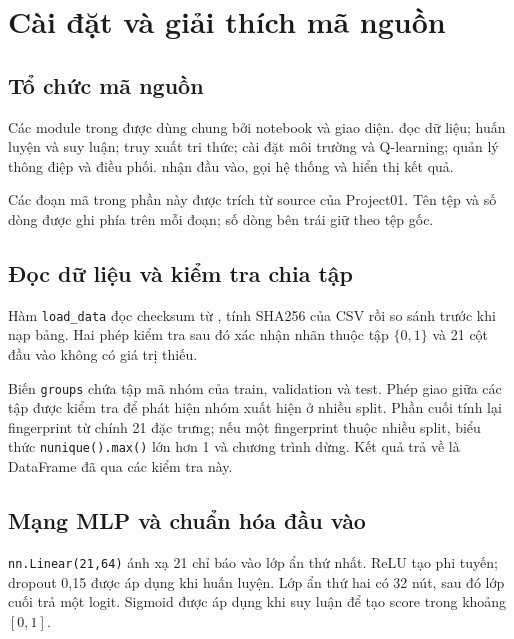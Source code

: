 \chapter{Cài đặt và giải thích mã nguồn}
\section{Tổ chức mã nguồn}
Các module trong  được dùng chung bởi notebook và giao diện.  đọc dữ liệu;  huấn luyện và suy luận;  truy xuất tri thức;  cài đặt môi trường và Q-learning;  quản lý thông điệp và điều phối.  nhận đầu vào, gọi hệ thống và hiển thị kết quả.

Các đoạn mã trong phần này được trích từ source của Project01. Tên tệp và số dòng được ghi phía trên mỗi đoạn; số dòng bên trái giữ theo tệp gốc.

\section{Đọc dữ liệu và kiểm tra chia tập}

Hàm \texttt{load\_data} đọc checksum từ , tính SHA256 của CSV rồi so sánh trước khi nạp bảng. Hai phép kiểm tra sau đó xác nhận nhãn thuộc tập $\{0,1\}$ và 21 cột đầu vào không có giá trị thiếu.

Biến \texttt{groups} chứa tập mã nhóm của train, validation và test. Phép giao giữa các tập được kiểm tra để phát hiện nhóm xuất hiện ở nhiều split. Phần cuối tính lại fingerprint từ chính 21 đặc trưng; nếu một fingerprint thuộc nhiều split, biểu thức \texttt{nunique().max()} lớn hơn 1 và chương trình dừng. Kết quả trả về là DataFrame đã qua các kiểm tra này.

\section{Mạng MLP và chuẩn hóa đầu vào}

\texttt{nn.Linear(21,64)} ánh xạ 21 chỉ báo vào lớp ẩn thứ nhất. ReLU tạo phi tuyến; dropout 0,15 được áp dụng khi huấn luyện. Lớp ẩn thứ hai có 32 nút, sau đó lớp cuối trả một logit. Sigmoid được áp dụng khi suy luận để tạo score trong khoảng $[0,1]$.


